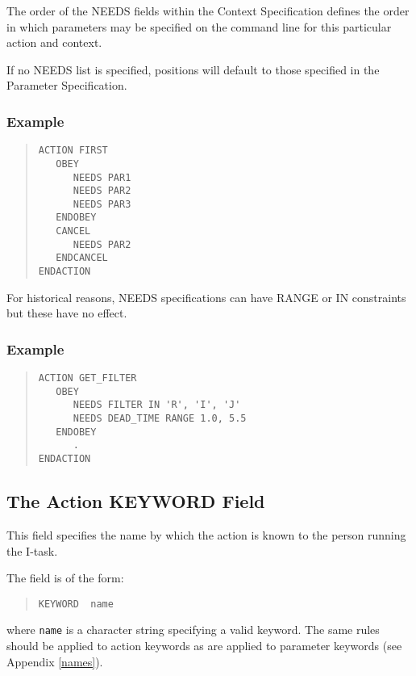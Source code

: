 \documentclass[twoside,11pt]{article}
\newcommand{\xlabel}[1]{}
\renewcommand{\_}{\texttt{\symbol{95}}}
\begin{document}
The order of the NEEDS fields within the Context Specification defines
the order in which parameters may be specified on the command line
for this particular action and context.

If no NEEDS list is specified, positions will default to those specified
in the Parameter Specification.

\subsubsection*{Example}
\begin{quote} \begin{verbatim}
ACTION FIRST
   OBEY
      NEEDS PAR1
      NEEDS PAR2
      NEEDS PAR3
   ENDOBEY
   CANCEL
      NEEDS PAR2
   ENDCANCEL
ENDACTION
\end{verbatim} \end{quote}
For historical reasons, NEEDS specifications can have RANGE or IN constraints
but these have no effect.

\subsubsection*{Example}
\begin{quote} \begin{verbatim}
ACTION GET_FILTER
   OBEY
      NEEDS FILTER IN 'R', 'I', 'J'
      NEEDS DEAD_TIME RANGE 1.0, 5.5
   ENDOBEY
      .
ENDACTION
\end{verbatim} \end{quote}

\subsection{The Action KEYWORD Field\xlabel{the_action_keyword_field}}

This field specifies the name by which the action is known to
the person running the I-task.

The field is of the form:
\begin{quote} \begin{verbatim}
KEYWORD  name
\end{verbatim} \end{quote}
where \texttt{name} is a character string specifying a valid keyword.
The same rules should be applied to action keywords as are applied to parameter
keywords (see Appendix \ref{names}).
\end{document}
